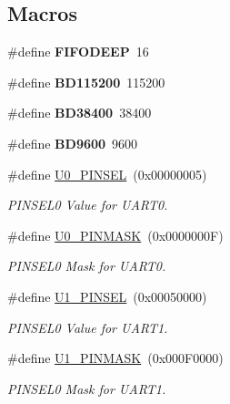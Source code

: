 \subsection*{Macros}
\begin{DoxyCompactItemize}
\item 
\mbox{\label{group__rtl22xx__uart_gacdb9744a4c4caeda0ce7c1eb0666f5ee}} 
\#define {\bfseries F\+I\+F\+O\+D\+E\+EP}~16
\item 
\mbox{\label{group__rtl22xx__uart_gad9ac4db4cf30ae14032cdb865f11e581}} 
\#define {\bfseries B\+D115200}~115200
\item 
\mbox{\label{group__rtl22xx__uart_ga7f53903f1b0a904c79c684d7e7f2397a}} 
\#define {\bfseries B\+D38400}~38400
\item 
\mbox{\label{group__rtl22xx__uart_ga97047a782f54ac1b2ca25ad103446703}} 
\#define {\bfseries B\+D9600}~9600
\item 
\mbox{\label{group__rtl22xx__uart_gaf0bd75f427852595defc905beac76626}} 
\#define \mbox{\hyperlink{group__rtl22xx__uart_gaf0bd75f427852595defc905beac76626}{U0\+\_\+\+P\+I\+N\+S\+EL}}~(0x00000005)
\begin{DoxyCompactList}\small\item\em P\+I\+N\+S\+E\+L0 Value for U\+A\+R\+T0. \end{DoxyCompactList}\item 
\mbox{\label{group__rtl22xx__uart_ga410f6d3e8d84bad7213cf910855cbd2d}} 
\#define \mbox{\hyperlink{group__rtl22xx__uart_ga410f6d3e8d84bad7213cf910855cbd2d}{U0\+\_\+\+P\+I\+N\+M\+A\+SK}}~(0x0000000\+F)
\begin{DoxyCompactList}\small\item\em P\+I\+N\+S\+E\+L0 Mask for U\+A\+R\+T0. \end{DoxyCompactList}\item 
\mbox{\label{group__rtl22xx__uart_ga95a74539a464b0618ea1ac4dab05ec35}} 
\#define \mbox{\hyperlink{group__rtl22xx__uart_ga95a74539a464b0618ea1ac4dab05ec35}{U1\+\_\+\+P\+I\+N\+S\+EL}}~(0x00050000)
\begin{DoxyCompactList}\small\item\em P\+I\+N\+S\+E\+L0 Value for U\+A\+R\+T1. \end{DoxyCompactList}\item 
\mbox{\label{group__rtl22xx__uart_ga77c49df9e8fbca24ba07f456023426a5}} 
\#define \mbox{\hyperlink{group__rtl22xx__uart_ga77c49df9e8fbca24ba07f456023426a5}{U1\+\_\+\+P\+I\+N\+M\+A\+SK}}~(0x000\+F0000)
\begin{DoxyCompactList}\small\item\em P\+I\+N\+S\+E\+L0 Mask for U\+A\+R\+T1. \end{DoxyCompactList}\end{DoxyCompactItemize}
